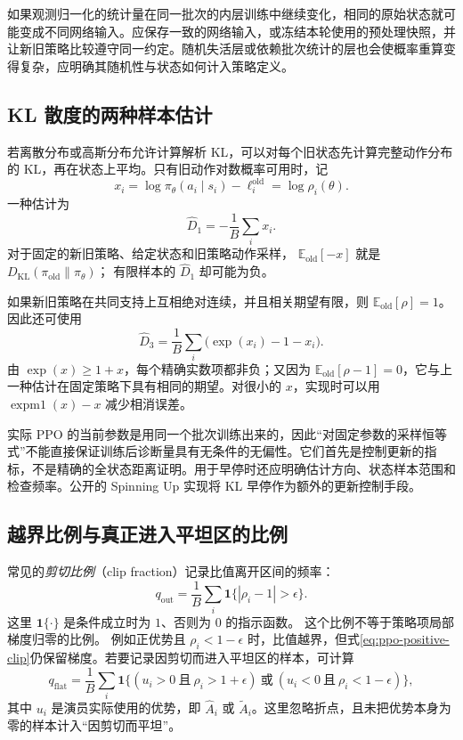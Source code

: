 \documentclass[UTF8,12pt,a4paper,fontset=fandol]{ctexart}
\begin{document}
如果观测归一化的统计量在同一批次的内层训练中继续变化，相同的原始状态就可能变成不同网络输入。应保存一致的网络输入，或冻结本轮使用的预处理快照，并让新旧策略比较遵守同一约定。随机失活层或依赖批次统计的层也会使概率重算变得复杂，应明确其随机性与状态如何计入策略定义。

\subsection{KL 散度的两种样本估计}

若离散分布或高斯分布允许计算解析 KL，可以对每个旧状态先计算完整动作分布的 KL，再在状态上平均。只有旧动作对数概率可用时，记
\[
  x_i=\log\pi_\theta(a_i\mid s_i)-\ell_i^{\mathrm{old}}
      =\log\rho_i(\theta).
\]
一种估计为
\begin{equation}
  \widehat D_1=-\frac1B\sum_i x_i.
  \label{eq:ppo-kl-log}
\end{equation}
对于固定的新旧策略、给定状态和旧策略动作采样，
$\mathbb E_{\mathrm{old}}[-x]$ 就是
$D_{\mathrm{KL}}(\pi_{\mathrm{old}}\|\pi_\theta)$；
有限样本的 $\widehat D_1$ 却可能为负。

如果新旧策略在共同支持上互相绝对连续，并且相关期望有限，则
$\mathbb E_{\mathrm{old}}[\rho]=1$。因此还可使用
\begin{equation}
  \widehat D_3
  =\frac1B\sum_i\bigl(\exp(x_i)-1-x_i\bigr).
  \label{eq:ppo-kl-nonnegative}
\end{equation}
由 $\exp(x)\ge1+x$，每个精确实数项都非负；又因为
$\mathbb E_{\mathrm{old}}[\rho-1]=0$，它与上一种估计在固定策略下具有相同的期望。对很小的 $x$，实现时可以用
$\operatorname{expm1}(x)-x$ 减少相消误差。

实际 PPO 的当前参数是用同一个批次训练出来的，因此“对固定参数的采样恒等式”不能直接保证训练后诊断量具有无条件的无偏性。它们首先是控制更新的指标，不是精确的全状态距离证明。用于早停时还应明确估计方向、状态样本范围和检查频率。公开的 Spinning Up 实现将 KL 早停作为额外的更新控制手段\cite{spinningup-ppo}。

\subsection{越界比例与真正进入平坦区的比例}

常见的\emph{剪切比例}（clip fraction）记录比值离开区间的频率：
\begin{equation}
  q_{\mathrm{out}}
  =\frac1B\sum_i
  \mathbf 1\{|\rho_i-1|>\epsilon\}.
  \label{eq:ppo-clip-fraction}
\end{equation}
这里 $\mathbf 1\{\cdot\}$ 是条件成立时为 $1$、否则为 $0$ 的指示函数。
这个比例不等于策略项局部梯度归零的比例。
例如正优势且 $\rho_i<1-\epsilon$ 时，比值越界，但式\eqref{eq:ppo-positive-clip}仍保留梯度。若要记录因剪切而进入平坦区的样本，可计算
\[
  q_{\mathrm{flat}}
  =\frac1B\sum_i
  \mathbf 1\{
    (u_i>0\ \text{且}\ \rho_i>1+\epsilon)
    \ \text{或}\
    (u_i<0\ \text{且}\ \rho_i<1-\epsilon)
  \},
\]
其中 $u_i$ 是演员实际使用的优势，即 $\widehat A_i$ 或
$\widetilde A_i$。这里忽略折点，且未把优势本身为零的样本计入“因剪切而平坦”。
\end{document}
